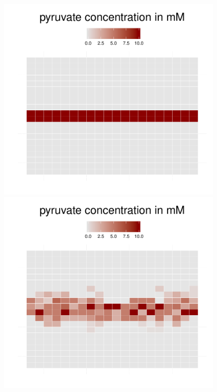 \begin{figure}[h!]
  \centering
  \begin{minipage}[t]{0.3\textwidth}
    \includegraphics[width=\textwidth]{diff1.pdf}
  \end{minipage}
  \begin{minipage}[t]{0.3\textwidth}
    \includegraphics[width=\textwidth]{diff2.pdf}

\end{minipage}
\end{figure}
